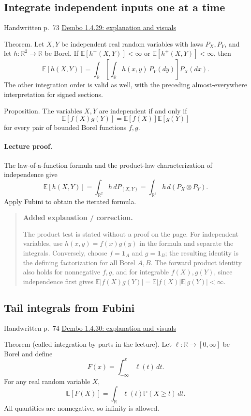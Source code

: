 \documentclass[11pt,letterpaper]{article}
\newcommand{\lecturesection}[1]{\subsection{#1}}
\begin{document}
\hypertarget{l8-s10}{}
\lecturesection{Integrate independent inputs one at a time}
{\small\textcolor{lectureink}{Handwritten p.\ 73} \quad \href{https://josephrbailey.com/probability/\#entry-1-4-29}{Dembo 1.4.29: explanation and visuals}}

Theorem. Let $X,Y$ be independent real random variables with laws $P_X,P_Y$, and let $h:\mathbb R^2\to\mathbb R$ be Borel. If $\mathbb E[h^-(X,Y)]<\infty$ or $\mathbb E[h^+(X,Y)]<\infty$, then \[\mathbb E[h(X,Y)]=\int_{\mathbb R}\left[\int_{\mathbb R}h(x,y)\,P_Y(dy)\right]P_X(dx).\] The other integration order is valid as well, with the preceding almost-everywhere interpretation for signed sections.

Proposition. The variables $X,Y$ are independent if and only if \[\mathbb E[f(X)g(Y)]=\mathbb E[f(X)]\mathbb E[g(Y)]\] for every pair of bounded Borel functions $f,g$.

\paragraph{Lecture proof.}
The law-of-a-function formula and the product-law characterization of independence give \[\mathbb E[h(X,Y)]=\int_{\mathbb R^2}h\,dP_{(X,Y)}=\int_{\mathbb R^2}h\,d(P_X\otimes P_Y).\] Apply Fubini to obtain the iterated formula.

\begin{quote}\small\textbf{Added explanation / correction.}

The product test is stated without a proof on the page. For independent variables, use $h(x,y)=f(x)g(y)$ in the formula and separate the integrals. Conversely, choose $f=\mathbf{1}_A$ and $g=\mathbf{1}_B$; the resulting identity is the defining factorization for all Borel $A,B$. The forward product identity also holds for nonnegative $f,g$, and for integrable $f(X),g(Y)$, since independence first gives $\mathbb E|f(X)g(Y)|=\mathbb E|f(X)|\mathbb E|g(Y)|<\infty$.
\end{quote}

\hypertarget{l8-s11}{}
\lecturesection{Tail integrals from Fubini}
{\small\textcolor{lectureink}{Handwritten p.\ 74} \quad \href{https://josephrbailey.com/probability/\#entry-1-4-30}{Dembo 1.4.30: explanation and visuals}}

Theorem (called integration by parts in the lecture). Let $\ell:\mathbb R\to[0,\infty]$ be Borel and define \[F(x)=\int_{-\infty}^{x}\ell(t)\,dt.\] For any real random variable $X$, \[\mathbb E[F(X)]=\int_{\mathbb R}\ell(t)\mathbb P(X\ge t)\,dt.\] All quantities are nonnegative, so infinity is allowed.
\end{document}
